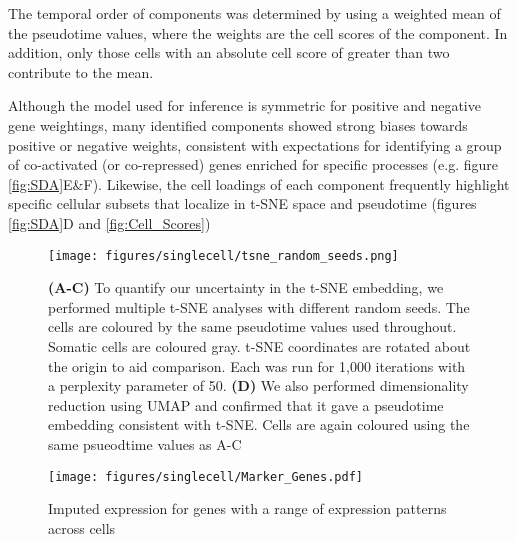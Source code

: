 The temporal order of components was determined by using a weighted mean of the pseudotime values, where the weights are the cell scores of the component. In addition, only those cells with an absolute cell score of greater than two contribute to the mean.

Although the model used for inference is symmetric for positive and negative gene weightings, many identified components showed strong biases towards positive or negative weights, consistent with expectations for identifying a group of co-activated (or co-repressed) genes enriched for specific processes (e.g. figure \ref{fig:SDA}E\&F). Likewise, the cell loadings of each component frequently highlight specific cellular subsets that localize in t-SNE space and pseudotime (figures \ref{fig:SDA}D and \ref{fig:Cell_Scores})


\begin{figure}[H]
	\centering
	\texttt{[image: figures/singlecell/tsne\_random\_seeds.png]}
	\caption[t-SNE random seed stability]{
		\textbf{(A-C)} To quantify our uncertainty in the t-SNE embedding, we performed multiple t-SNE analyses with different random seeds. The cells are coloured by the same pseudotime values used throughout. Somatic cells are coloured gray. t-SNE coordinates are rotated about the origin to aid comparison. Each was run for 1,000 iterations with a perplexity parameter of 50.
		\textbf{(D)} We also performed dimensionality reduction using UMAP and confirmed that it gave a pseudotime embedding consistent with t-SNE. Cells are again coloured using the same psueodtime values as A-C}
	\label{fig:tSNEseeds}
\end{figure}

\begin{figure}[H]
	\centering
	\texttt{[image: figures/singlecell/Marker\_Genes.pdf]}
	\caption[Marker Genes]{Imputed expression for genes with a range of expression patterns across cells}
	\label{fig:Marker_Genes}
\end{figure}

